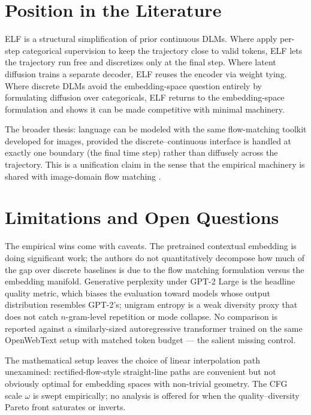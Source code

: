 \documentclass[11pt]{article}
\begin{document}
\section*{Position in the Literature}

ELF is a structural simplification of prior continuous DLMs. Where \citet{li2022diffusionlm} apply per-step categorical supervision to keep the trajectory close to valid tokens, ELF lets the trajectory run free and discretizes only at the final step. Where latent diffusion \citep{rombach2022ldm} trains a separate decoder, ELF reuses the encoder via weight tying. Where discrete DLMs \citep{austin2021d3pm, sahoo2024mdlm, lou2024sedd} avoid the embedding-space question entirely by formulating diffusion over categoricals, ELF returns to the embedding-space formulation and shows it can be made competitive with minimal machinery.

The broader thesis: language can be modeled with the same flow-matching toolkit developed for images, provided the discrete--continuous interface is handled at exactly one boundary (the final time step) rather than diffusely across the trajectory. This is a unification claim in the sense that the empirical machinery is shared with image-domain flow matching \citep{lipman2022fm, liu2022rectified}.

\section*{Limitations and Open Questions}

The empirical wins come with caveats. The pretrained contextual embedding is doing significant work; the authors do not quantitatively decompose how much of the gap over discrete baselines is due to the flow matching formulation versus the embedding manifold. Generative perplexity under GPT-2 Large is the headline quality metric, which biases the evaluation toward models whose output distribution resembles GPT-2's; unigram entropy is a weak diversity proxy that does not catch $n$-gram-level repetition or mode collapse. No comparison is reported against a similarly-sized autoregressive transformer trained on the same OpenWebText setup with matched token budget --- the salient missing control.

The mathematical setup leaves the choice of linear interpolation path unexamined: rectified-flow-style straight-line paths are convenient but not obviously optimal for embedding spaces with non-trivial geometry. The CFG scale $\omega$ is swept empirically; no analysis is offered for when the quality--diversity Pareto front saturates or inverts.
\end{document}
